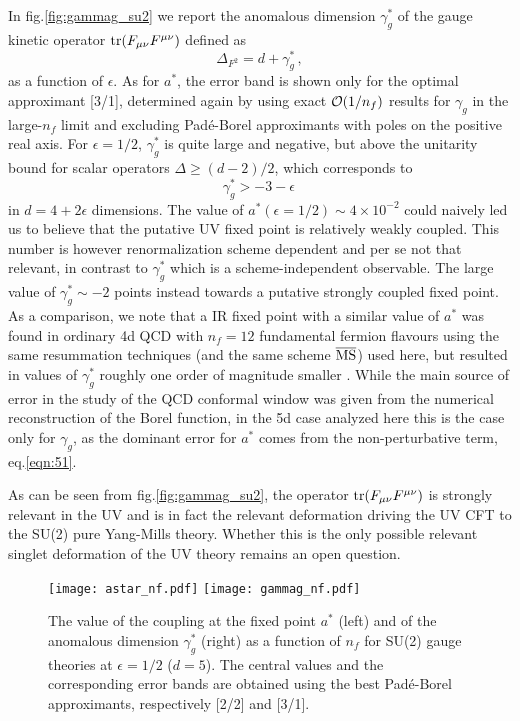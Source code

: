 \documentclass [11pt]{article}
\def\be{\begin{equation}} \def\ee{\end{equation}}
\begin{document}
In fig.\ref{fig:gammag_su2} we report the anomalous dimension $\gamma_g^*$ of the gauge kinetic operator ${\rm tr} (F_{\mu\nu}F^{\mu\nu})$ defined as 
\be
\Delta_{F^2}=d+\gamma_g^*\,,
\ee
as a function of $\epsilon$.
As for $a^*$, the error band is shown only for the optimal approximant [3/1], determined again by using exact ${\cal O}(1/n_f)$ results for $\gamma_g$ in the  large-$n_f$ limit and excluding Pad\'e-Borel approximants with poles on the positive real axis.
For $\epsilon = 1/2$, $\gamma_g^*$ is quite large and negative, but above the unitarity bound for scalar operators $\Delta\ge(d-2)/2$, which corresponds to
\be
\gamma_g^*> -3-\epsilon \,
\ee
in $d=4+2\epsilon$ dimensions. The value of $a^*(\epsilon=1/2)\sim 4\times 10^{-2}$ could naively led us to believe that the putative UV fixed point is relatively weakly coupled.
This number is however renormalization scheme dependent and per se not that relevant, in contrast to $\gamma_g^*$ which is a scheme-independent observable.
The large value of $\gamma_g^*\sim -2$ points instead towards a putative strongly coupled fixed point. As a comparison, we note that a IR fixed point with a similar value of $a^*$
was found in ordinary 4d QCD with $n_f=12$ fundamental fermion flavours using the same resummation techniques (and the same scheme $\overline{\rm MS}$) used here, but resulted in values of $\gamma_g^*$ 
roughly one order of magnitude smaller \cite{DiPietro:2020jne}.
While the main source of error in the study of the QCD conformal window was given from the numerical reconstruction of the Borel function, in the 5d case analyzed here this is the case only for $\gamma_g$, as the dominant error for $a^*$
comes from the non-perturbative term, eq.\eqref{eqn:51}.

As can be seen from fig.\ref{fig:gammag_su2}, the operator ${\rm tr}( F_{\mu\nu}F^{\mu\nu})$ is strongly relevant in the UV and is in fact the relevant deformation driving the UV CFT to the SU(2) pure Yang-Mills theory. Whether this is the only possible relevant singlet deformation of the UV theory remains an open question.

\begin{figure} [t!]
 \centering
 \texttt{[image: astar\_nf.pdf]}  
 \hspace*{4pt}
  \texttt{[image: gammag\_nf.pdf]}  
\caption{The value of the coupling at the fixed point $a^*$ (left) and of the anomalous dimension $\gamma_g^*$ (right) as a function of $n_f$ for SU(2) gauge theories  at $\epsilon=1/2$ ($d=5$).
The central values and the corresponding error bands are obtained using the best Pad\'e-Borel approximants, respectively  [2/2] and [3/1].  }\label{fig:su2nf24}
\end{figure}
\end{document}
